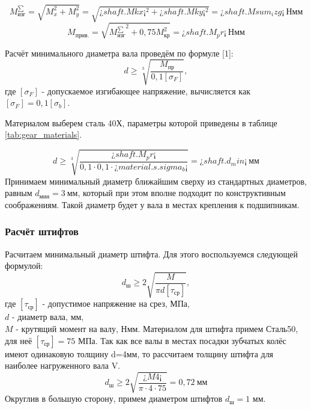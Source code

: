 \documentclass[14pt,a4paper,russian]{scrartcl}
\begin{document}
        \[ M^{\sum}_\text{изг} = \sqrt{M_x^2 + M_y^2} = \sqrt{¿shaft.Mkx¡^2 + ¿shaft.Mky¡^2} = ¿shaft.Msum_izg¡\ \text{Нмм}\]
        \[ M_\text{прив.} = \sqrt{{M^{\sum}_\text{изг}}^2 + 0,75M_\text{кр}^2} = ¿shaft.M_pr¡\ \text{Нмм}\]

        Расчёт минимального диаметра вала проведём по формуле [1]:
        \[ d\geq \sqrt[3]{\frac{M_\text{пр}}{0,1[\sigma_F]}}, \]
        где \( [\sigma_F] \) - допускаемое изгибающее напряжение, вычисляется как
         \( [\sigma_F] = 0,1[\sigma_b] \).\par
        Материалом выберем сталь 40Х, параметры которой приведены в таблице \ref{tab:gear_materials}.\par

        \[ d\geq \sqrt[3]{\frac{¿shaft.M_pr¡}{0,1\cdot 0,1\cdot ¿material.s.sigma_b¡}} = ¿shaft.d_min¡\ \text{мм} \]
        Принимаем минимальный диаметр ближайшим сверху из стандартных диаметров, равным
        \( d_{\text{мин}} = 3\ \text{мм} \), который при этом вполне подходит по конструктивным
        соображениям. Такой диаметр будет у вала в местах крепления к подшипникам.

    \subsubsection{Расчёт штифтов}
        Расчитаем минимальный диаметр штифта. Для этого воспользуемся следующей формулой:
        \[ d_\text{ш} \geq 2\sqrt{\frac{M}{\pi d [\tau_{\text{ср}}]}}, \]
        где \( [\tau_{\text{ср}}] \) - допустимое напряжение на срез, МПа,\\
        \( d \) - диаметр вала, мм,\\
        \( M \) - крутящий момент на валу, Нмм.
        Материалом для штифта примем Сталь50, для неё \( [\tau_{\text{ср}}] =75\) МПа.
        Так как все валы в местах посадки зубчатых колёс имеют одинаковую толщину d=4мм, то рассчитаем
        толщину штифта для наиболее нагруженного вала V.
        \[ d_\text{ш} \geq 2\sqrt{\frac{¿M4¡}{\pi\cdot 4\cdot 75}} = 0,72\ \text{мм} \]
        Округлив в большую сторону, примем диаметром штифтов \( d_\text{ш} = 1 \) мм.
        
\end{document}
